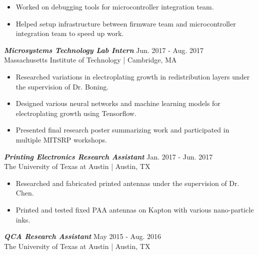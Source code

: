 \documentclass[letter]{res}
\begin{document}
\begin{resume}
 \vspace{-4mm}

 \begin{itemize}
 \item Worked on debugging tools for microcontroller integration team. 
 \item Helped setup infrastructure between firmware team and microcontroller integration team to speed up work. 
 \end{itemize}
 
\vspace{-2mm}

{\sl \textbf{Microsystems Technology Lab Intern}} \hfill Jun. 2017 - Aug. 2017\\
Massachusetts Institute of Technology | Cambridge, MA \newline

 \vspace{-4mm}

 \begin{itemize}
 \item Researched variations in electroplating growth in redistribution layers under the supervision of Dr. Boning.
 \item Designed various neural networks and machine learning models for electroplating growth using Tensorflow.
 \item Presented final research poster summarizing work and participated in multiple MITSRP workshops.
 \end{itemize}
 
\vspace{-2mm}

{\sl \textbf{Printing Electronics Research Assistant}} \hfill Jan. 2017 - Jun. 2017\\
The University of Texas at Austin | Austin, TX \newline

 \vspace{-4mm}

 \begin{itemize}
 \item Researched and fabricated printed antennas under the supervision of Dr. Chen.
 \item Printed and tested fixed PAA antennas on Kapton with various nano-particle inks.
 \end{itemize}
 
\vspace{-2mm}

{\sl \textbf{QCA Research Assistant}} \hfill May 2015 - Aug. 2016\\
The University of Texas at Austin | Austin, TX \newline


\end{resume}
\end{document}
